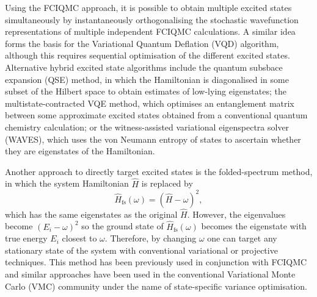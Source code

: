 \documentclass[%
 reprint,
 amsmath,amssymb,
 aps,
]{revtex4-2}
\begin{document}
{ Using the FCIQMC approach, it is possible to obtain multiple excited states simultaneously by instantaneously orthogonalising the stochastic wavefunction representations of multiple independent FCIQMC calculations.\cite{Blunt2015} A similar idea forms the basis for the Variational Quantum Deflation (VQD)\cite{Higgott2019} algorithm, although this requires sequential optimisation of the different excited states. Alternative hybrid excited state algorithms include the quantum subsbace expansion (QSE) method,\cite{McClean2017,Colless2018, Takeshita2020} in which the Hamiltonian is diagonalised in some subset of the Hilbert space to obtain estimates of low-lying eigenstates; the multistate-contracted VQE method,\cite{Parrish2019} which optimises an entanglement matrix between some approximate excited states obtained from a conventional quantum chemistry calculation; or the witness-assisted variational eigenspectra solver (WAVES),\cite{Santagati2018} which uses the von Neumann entropy of states to ascertain whether they are eigenstates of the Hamiltonian.}

Another approach to directly target excited states is the folded-spectrum method,\cite{Peruzzo2014,Cao2019,CadiTazi2023} in which the system Hamiltonian $\hat H$ is replaced by
\begin{equation}
\hat H_\mathrm{fs} (\omega) =  (\hat H - \omega)^2,
\label{eq:fs_ham}
\end{equation}
which has the same eigenstates as the original $\hat H$. However, the eigenvalues become $(E_i - \omega)^2$ so the ground state of $\hat H_\mathrm{fs}(\omega)$ becomes the eigenstate with true energy $E_i$ closest to $\omega$. Therefore, by changing $\omega$ one can target any stationary state of the system with conventional variational or projective techniques. { This method has been previously used in conjunction with FCIQMC\cite{Booth2012}} and similar approaches have been used in the conventional Variational Monte Carlo (VMC) community under the name of state-specific variance optimisation.\cite{Umrigar1988, Zhao2016,Shea2017,Cuzzocrea2020, Otis2023}
\end{document}

